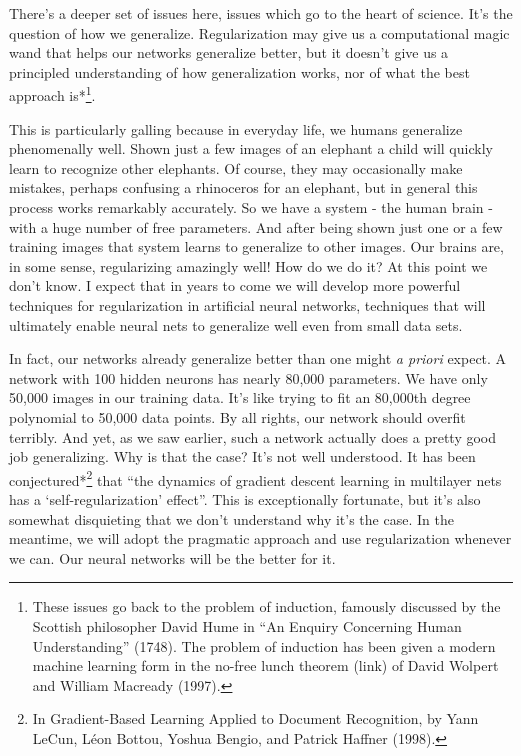 There's a deeper set of issues here, issues which go to the heart of science. It's the question of how we generalize. Regularization may give us a computational magic wand that helps our networks generalize better, but it doesn't give us a principled understanding of how generalization works, nor of what the best approach is*\footnote{These issues go back to the problem of induction, famously discussed by the Scottish philosopher David Hume in ``An Enquiry Concerning Human Understanding'' (1748). The problem of induction has been given a modern machine learning form in the no-free lunch theorem (link) of David Wolpert and William Macready (1997).}.


This is particularly galling because in everyday life, we humans generalize phenomenally well. Shown just a few images of an elephant a child will quickly learn to recognize other elephants. Of course, they may occasionally make mistakes, perhaps confusing a rhinoceros for an elephant, but in general this process works remarkably accurately. So we have a system - the human brain - with a huge number of free parameters. And after being shown just one or a few training images that system learns to generalize to other images. Our brains are, in some sense, regularizing amazingly well! How do we do it? At this point we don't know. I expect that in years to come we will develop more powerful techniques for regularization in artificial neural networks, techniques that will ultimately enable neural nets to generalize well even from small data sets.


In fact, our networks already generalize better than one might \emph{a priori} expect. A network with 100 hidden neurons has nearly 80,000 parameters. We have only 50,000 images in our training data. It's like trying to fit an 80,000th degree polynomial to 50,000 data points. By all rights, our network should overfit terribly. And yet, as we saw earlier, such a network actually does a pretty good job generalizing. Why is that the case? It's not well understood. It has been conjectured*\footnote{In Gradient-Based Learning Applied to Document Recognition, by Yann LeCun, Léon Bottou, Yoshua Bengio, and Patrick Haffner (1998).} that ``the dynamics of gradient descent learning in multilayer nets has a `self-regularization' effect''. This is exceptionally fortunate, but it's also somewhat disquieting that we don't understand why it's the case. In the meantime, we will adopt the pragmatic approach and use regularization whenever we can. Our neural networks will be the better for it.


